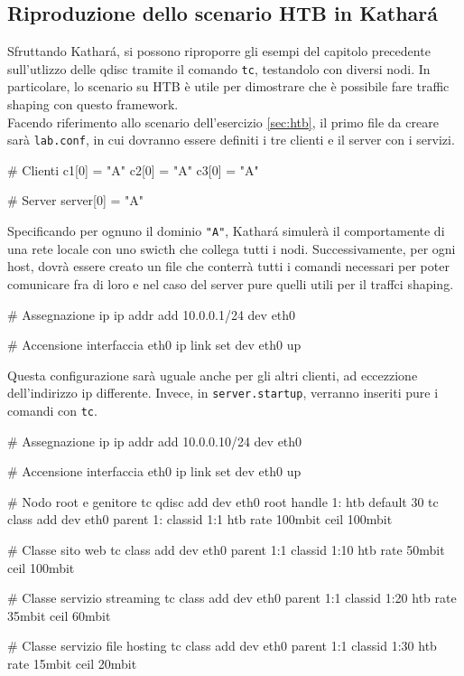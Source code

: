 \subsection{Riproduzione dello scenario HTB in Kathará}
Sfruttando Kathará, si possono riproporre gli esempi del capitolo precedente sull'utlizzo delle qdisc tramite il comando \texttt{tc}, testandolo con diversi nodi.
In particolare, lo scenario su HTB è utile per dimostrare che è possibile fare traffic shaping con questo framework.\\
\vspace*{0.01\textheight}
Facendo riferimento allo scenario dell'esercizio \ref{sec:htb}, il primo file da creare sarà \texttt{lab.conf}, in cui dovranno essere definiti i tre clienti e il server con i servizi.
\begin{kathara}
  # Clienti
  c1[0] = "A"
  c2[0] = "A"
  c3[0] = "A"
  
  # Server
  server[0] = "A"
\end{kathara}
Specificando per ognuno il dominio \texttt{"A"}, Kathará simulerà il comportamente di una rete locale con uno swicth che collega tutti i nodi.
Successivamente, per ogni host, dovrà essere creato un file che conterrà tutti i comandi necessari per poter comunicare fra di loro e nel caso del server pure quelli utili per il traffci shaping.
\begin{kathara}[c1.startup]
  # Assegnazione ip
  ip addr add 10.0.0.1/24 dev eth0

  # Accensione interfaccia eth0
  ip link set dev eth0 up
\end{kathara}
Questa configurazione sarà uguale anche per gli altri clienti, ad eccezzione dell'indirizzo ip differente. Invece, in \texttt{server.startup}, verranno inseriti pure i comandi con \texttt{tc}.
\begin{bash}
  # Assegnazione ip
  ip addr add 10.0.0.10/24 dev eth0

  # Accensione interfaccia eth0
  ip link set dev eth0 up

  # Nodo root e genitore
  tc qdisc add dev eth0 root handle 1: htb default 30
  tc class add dev eth0 parent 1: classid 1:1 htb rate 100mbit ceil 100mbit

  # Classe sito web
  tc class add dev eth0 parent 1:1 classid 1:10 htb rate 50mbit ceil 100mbit

  # Classe servizio streaming
  tc class add dev eth0 parent 1:1 classid 1:20 htb rate 35mbit ceil 60mbit

  # Classe servizio file hosting
  tc class add dev eth0 parent 1:1 classid 1:30 htb rate 15mbit ceil 20mbit
\end{bash}
